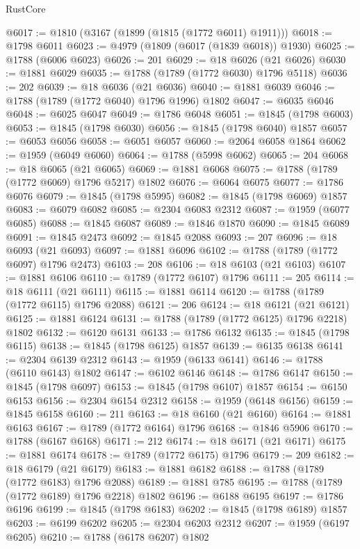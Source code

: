 \begin{lexlean}{RustCore}
\begin{coremodule}
@6017 := @1810 (@3167 (@1899 (@1815 (@1772 @6011) @1911)))
@6018 := @1798 @6011
@6023 := @4979 (@1809 (@6017 (@1839 @6018)) @1930)
@6025 := @1788 (@6006 @6023)
@6026 := 201
@6029 := @18 @6026 (@21 @6026)
@6030 := @1881 @6029
@6035 := @1788 (@1789 (@1772 @6030) @1796 @5118)
@6036 := 202
@6039 := @18 @6036 (@21 @6036)
@6040 := @1881 @6039
@6046 := @1788 (@1789 (@1772 @6040) @1796 @1996) @1802
@6047 := @6035 @6046
@6048 := @6025 @6047
@6049 := @1786 @6048
@6051 := @1845 (@1798 @6003)
@6053 := @1845 (@1798 @6030)
@6056 := @1845 (@1798 @6040) @1857
@6057 := @6053 @6056
@6058 := @6051 @6057
@6060 := @2064 @6058 @1864
@6062 := @1959 (@6049 @6060)
@6064 := @1788 (@5998 @6062)
@6065 := 204
@6068 := @18 @6065 (@21 @6065)
@6069 := @1881 @6068
@6075 := @1788 (@1789 (@1772 @6069) @1796 @5217) @1802
@6076 := @6064 @6075
@6077 := @1786 @6076
@6079 := @1845 (@1798 @5995)
@6082 := @1845 (@1798 @6069) @1857
@6083 := @6079 @6082
@6085 := @2304 @6083 @2312
@6087 := @1959 (@6077 @6085)
@6088 := @1845 @6087
@6089 := @1846 @1870
@6090 := @1845 @6089
@6091 := @1845 @2473
@6092 := @1845 @2088
@6093 := 207
@6096 := @18 @6093 (@21 @6093)
@6097 := @1881 @6096
@6102 := @1788 (@1789 (@1772 @6097) @1796 @2473)
@6103 := 208
@6106 := @18 @6103 (@21 @6103)
@6107 := @1881 @6106
@6110 := @1789 (@1772 @6107) @1796
@6111 := 205
@6114 := @18 @6111 (@21 @6111)
@6115 := @1881 @6114
@6120 := @1788 (@1789 (@1772 @6115) @1796 @2088)
@6121 := 206
@6124 := @18 @6121 (@21 @6121)
@6125 := @1881 @6124
@6131 := @1788 (@1789 (@1772 @6125) @1796 @2218) @1802
@6132 := @6120 @6131
@6133 := @1786 @6132
@6135 := @1845 (@1798 @6115)
@6138 := @1845 (@1798 @6125) @1857
@6139 := @6135 @6138
@6141 := @2304 @6139 @2312
@6143 := @1959 (@6133 @6141)
@6146 := @1788 (@6110 @6143) @1802
@6147 := @6102 @6146
@6148 := @1786 @6147
@6150 := @1845 (@1798 @6097)
@6153 := @1845 (@1798 @6107) @1857
@6154 := @6150 @6153
@6156 := @2304 @6154 @2312
@6158 := @1959 (@6148 @6156)
@6159 := @1845 @6158
@6160 := 211
@6163 := @18 @6160 (@21 @6160)
@6164 := @1881 @6163
@6167 := @1789 (@1772 @6164) @1796
@6168 := @1846 @5906
@6170 := @1788 (@6167 @6168)
@6171 := 212
@6174 := @18 @6171 (@21 @6171)
@6175 := @1881 @6174
@6178 := @1789 (@1772 @6175) @1796
@6179 := 209
@6182 := @18 @6179 (@21 @6179)
@6183 := @1881 @6182
@6188 := @1788 (@1789 (@1772 @6183) @1796 @2088)
@6189 := @1881 @785
@6195 := @1788 (@1789 (@1772 @6189) @1796 @2218) @1802
@6196 := @6188 @6195
@6197 := @1786 @6196
@6199 := @1845 (@1798 @6183)
@6202 := @1845 (@1798 @6189) @1857
@6203 := @6199 @6202
@6205 := @2304 @6203 @2312
@6207 := @1959 (@6197 @6205)
@6210 := @1788 (@6178 @6207) @1802

\end{coremodule}
\end{lexlean}
